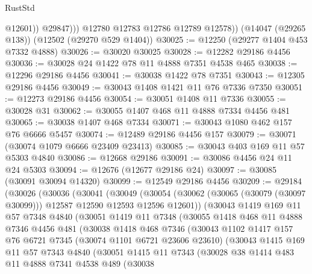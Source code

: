 \begin{lexlean}{RustStd}
\begin{coremodule}
                  @12601))
              @29847)))
        @12780
        @12783
        @12786
        @12789
        @12578))
    (@14047 (@29265 @138))
    (@12502 (@29270 @529 @1404))
@30025 := @12250 (@29277 @1404 @453 @7332 @4888)
@30026 := @30020 @30025
@30028 := @12282 @29186 @4456
@30036 := @30028 @24 @1422 @78 @11 @4888 @7351 @4538 @465
@30038 := @12296 @29186 @4456
@30041 := @30038 @1422 @78 @7351
@30043 := @12305 @29186 @4456
@30049 := @30043 @1408 @1421 @11 @76 @7336 @7350
@30051 := @12273 @29186 @4456
@30054 := @30051 @1408 @11 @7336
@30055 := @30028 @31
@30062 := @30055 @1407 @468 @11 @4888 @7334 @4456 @481
@30065 := @30038 @1407 @468 @7334
@30071 := @30043 @1080 @462 @157 @76 @6666 @5457
@30074 := @12489 @29186 @4456 @157
@30079 := @30071 (@30074 @1079 @6666 @23409 @23413)
@30085 := @30043 @403 @169 @11 @57 @5303 @4840
@30086 := @12668 @29186
@30091 := @30086 @4456 @24 @11 @24 @5303
@30094 := @12676 (@12677 @29186 @24)
@30097 := @30085 (@30091 @30094 @14320)
@30099 := @12549 @29186 @4456
@30209 := @29184
    (@30026
      (@30036
        (@30041
          (@30049
            (@30054 (@30062 (@30065 (@30079 (@30097 @30099))) @12587 @12590 @12593 @12596 @12601))
            (@30043
              @1419
              @169
              @11
              @57
              @7348
              @4840
              (@30051
                @1419
                @11
                @7348
                (@30055
                  @1418
                  @468
                  @11
                  @4888
                  @7346
                  @4456
                  @481
                  (@30038
                    @1418
                    @468
                    @7346
                    (@30043
                      @1102
                      @1417
                      @157
                      @76
                      @6721
                      @7345
                      (@30074 @1101 @6721 @23606 @23610)
                      (@30043
                        @1415
                        @169
                        @11
                        @57
                        @7343
                        @4840
                        (@30051
                          @1415
                          @11
                          @7343
                          (@30028
                            @38
                            @1414
                            @483
                            @11
                            @4888
                            @7341
                            @4538
                            @489
                            (@30038

\end{coremodule}
\end{lexlean}

